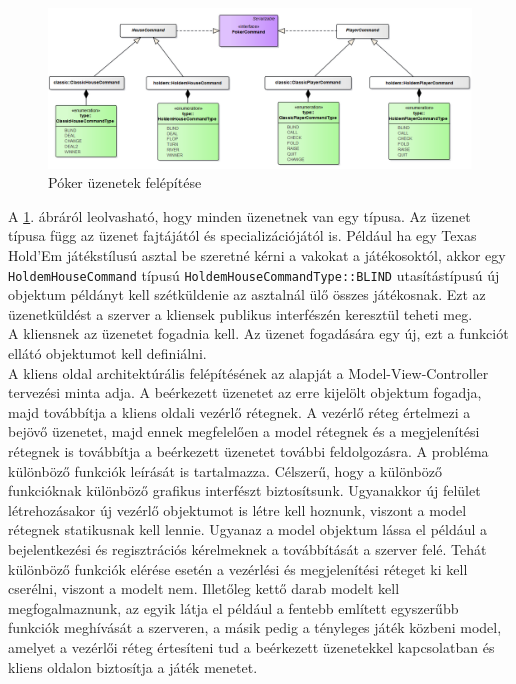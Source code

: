 \begin{figure}[h!]
	\caption{Póker üzenetek felépítése}
	\label{fig:messaging}
	\centering
	\includegraphics[width=\linewidth]{developer-documentation/images/messaging.png}
\end{figure}
A \ref{fig:messaging}. ábráról leolvasható, hogy minden üzenetnek van egy típusa. Az üzenet típusa függ az üzenet fajtájától és specializációjától is. Például ha egy Texas Hold'Em játékstílusú asztal be szeretné kérni a vakokat a játékosoktól, akkor egy \texttt{HoldemHouseCommand} típusú \texttt{HoldemHouseCommandType::BLIND} utasítástípusú új objektum példányt kell szétküldenie az asztalnál ülő összes játékosnak. Ezt az üzenetküldést a szerver a kliensek publikus interfészén keresztül teheti meg. \\
A kliensnek az üzenetet fogadnia kell. Az üzenet fogadására egy új, ezt a funkciót ellátó objektumot kell definiálni. \\
A kliens oldal architektúrális felépítésének az alapját a Model-View-Controller tervezési minta adja. A beérkezett üzenetet az erre kijelölt objektum fogadja, majd továbbítja a kliens oldali vezérlő rétegnek. A vezérlő réteg értelmezi a bejövő üzenetet, majd ennek megfelelően a model rétegnek és a megjelenítési rétegnek is továbbítja a beérkezett üzenetet további feldolgozásra. A probléma különböző funkciók leírását is tartalmazza. Célszerű, hogy a különböző funkcióknak különböző grafikus interfészt biztosítsunk. Ugyanakkor új felület létrehozásakor új vezérlő objektumot is létre kell hoznunk, viszont a model rétegnek statikusnak kell lennie. Ugyanaz a model objektum lássa el például a bejelentkezési és regisztrációs kérelmeknek a továbbítását a szerver felé. Tehát különböző funkciók elérése esetén a vezérlési és megjelenítési réteget ki kell cserélni, viszont a modelt nem. Illetőleg kettő darab modelt kell megfogalmaznunk, az egyik látja el például a fentebb említett egyszerűbb funkciók meghívását a szerveren, a másik pedig a tényleges játék közbeni model, amelyet a vezérlői réteg értesíteni tud a beérkezett üzenetekkel kapcsolatban és kliens oldalon biztosítja a játék menetet.  \\
